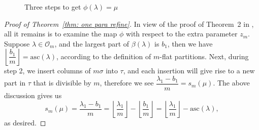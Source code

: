 \documentclass[11pt,reqno]{amsart}
\numberwithin{equation}{section}
\theoremstyle{plain}
\theoremstyle{definition}
\newcommand{\OO}{\mathcal{O}}
\newcommand{\redd}{\textcolor{red}}
\def\asc{\mathrm{asc}}
\begin{document}
\begin{figure}[htp]
\begin{ferrers}
\highlightcellbyletter{2}{1}{\redd{3}}
\highlightcellbyletter{3}{1}{\redd{3}}
\highlightcellbyletter{4}{1}{\redd{3}}
\highlightcellbyletter{4}{2}{\redd{3}}
\highlightcellbyletter{4}{3}{\redd{3}}


\putbelow
{}
\end{ferrers}
\caption{Three steps to get $\phi(\lambda)=\mu$}
\label{S-K map}
\end{figure}
\begin{proof}[Proof of Theorem~\ref{thm: one para refine}]
In view of the proof of Theorem~2 in \cite{KX}, all it remains is to examine the map $\phi$ with respect to the extra parameter $z_m$. Suppose $\lambda\in\OO_m$, and the largest part of $\beta(\lambda)$ is $b_1$, then we have $\left\lfloor\dfrac{b_1}{m}\right\rfloor=\asc(\lambda)$, according to the definition of $m$-flat partitions. Next, during step 2, we insert columns of $m\sigma$ into $\tau$, and each insertion will give rise to a new part in $\tau$ that is divisible by $m$, therefore we see $\dfrac{\lambda_1-b_1}{m}=s_m(\mu)$. The above discussion gives us $$s_m(\mu)=\dfrac{\lambda_1-b_1}{m}=\left\lfloor\dfrac{\lambda_1}{m}\right\rfloor-\left\lfloor\dfrac{b_1}{m}\right\rfloor=\left\lfloor\dfrac{\lambda_1}{m}\right\rfloor-\asc(\lambda),$$
as desired.
\end{proof}
\end{document}
